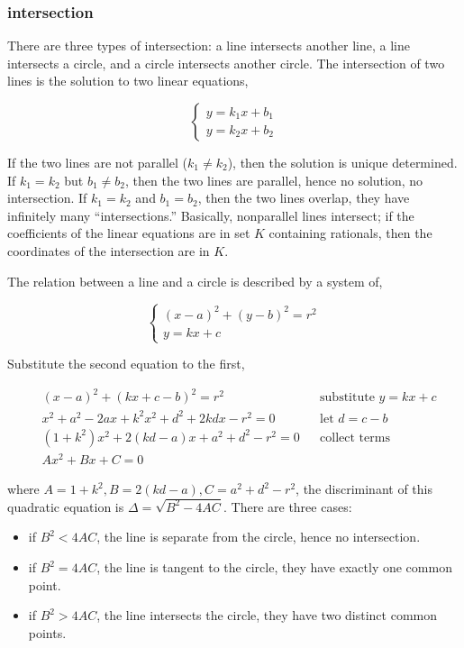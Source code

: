 \documentclass[b5paper]{article}
\begin{document}
\subsubsection{intersection}
There are three types of intersection: a line intersects another line, a line intersects a circle, and a circle intersects another circle. The intersection of two lines is the solution to two linear equations,

\[
\begin{cases}
y = k_1 x + b_1 \\
y = k_2 x + b_2
\end{cases}
\]

If the two lines are not parallel ($k_1 \ne k_2$), then the solution is unique determined. If $k_1 = k_2$ but $b_1 \ne b_2$, then the two lines are parallel, hence no solution, no intersection. If $k_1 = k_2$ and $b_1 = b_2$, then the two lines overlap, they have infinitely many \enquote{intersections.} Basically, nonparallel lines intersect; if the coefficients of the linear equations are in set $K$ containing rationals, then the coordinates of the intersection are in $K$.

The relation between a line and a circle is described by a system of,

\[
\begin{cases}
(x - a)^2 + (y - b)^2 = r^2 \\
y = kx + c
\end{cases}
\]

Substitute the second equation to the first,

\begin{align*}
& (x - a)^2 + (kx + c - b)^2 = r^2  &&\text{substitute }y = kx + c \\
& x^2 + a^2 - 2ax + k^2x^2 + d^2 + 2kdx - r^2 =0 && \text{let }d = c - b \\
& (1 + k^2)x^2 + 2(kd - a)x + a^2 + d^2 - r^2 = 0 && \text{collect terms} \\
& Ax^2 + Bx + C = 0
\end{align*}

where $A = 1 + k^2, B = 2(kd - a), C = a^2 + d^2 - r^2$, the discriminant of this quadratic equation is $\Delta = \sqrt{B^2 - 4AC}$. There are three cases:
\begin{itemize}
\item if $B^2 < 4AC$, the line is separate from the circle, hence no intersection.
\item if $B^2 = 4AC$, the line is tangent to the circle, they have exactly one common point.
\item if $B^2 > 4AC$, the line intersects the circle, they have two distinct common points.
\end{itemize}
\end{document}
